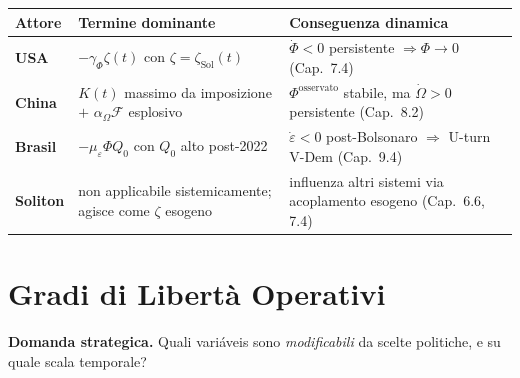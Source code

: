{\def\LTcaptype{none} %
{\small\begin{longtable}[]{@{}
  >{\raggedright\arraybackslash}p{}
  >{\raggedright\arraybackslash}p{}
  >{\raggedright\arraybackslash}p{}@{}}
\toprule\noalign{}
\begin{minipage}[b]{\linewidth}\raggedright
Attore
\end{minipage} & \begin{minipage}[b]{\linewidth}\raggedright
Termine dominante
\end{minipage} & \begin{minipage}[b]{\linewidth}\raggedright
Conseguenza dinamica
\end{minipage} \\
\midrule\noalign{}
\endhead
\bottomrule\noalign{}
\endlastfoot
\textbf{USA} & \(-\gamma_\Phi \zeta(t)\) con
\(\zeta = \zeta_{\text{Sol}}(t)\) & \(\dot\Phi < 0\) persistente
\(\Rightarrow \Phi \to 0\) (Cap.~7.4) \\
\textbf{China} & \(K(t)\) massimo da imposizione \(+\)
\(\alpha_\Omega \mathcal{F}\) esplosivo & \(\Phi^{\text{osservato}}\)
stabile, ma \(\dot\Omega > 0\) persistente (Cap.~8.2) \\
\textbf{Brasil} & \(-\mu_\varepsilon \Phi Q_0\) con \(Q_0\) alto
post-2022 & \(\dot\varepsilon < 0\) post-Bolsonaro \(\Rightarrow\)
U-turn V-Dem (Cap.~9.4) \\
\textbf{Soliton} & non applicabile sistemicamente; agisce come
\(\zeta\) esogeno & influenza altri sistemi via acoplamento esogeno
(Cap.~6.6, 7.4) \\
\end{longtable}}
}



\section{Gradi di Libertà
Operativi}\label{gradi-di-libertuxe0-operativi}

\Hypoth{} \textbf{Domanda strategica.} Quali variáveis sono
\emph{modificabili} da scelte politiche, e su quale scala temporale?

